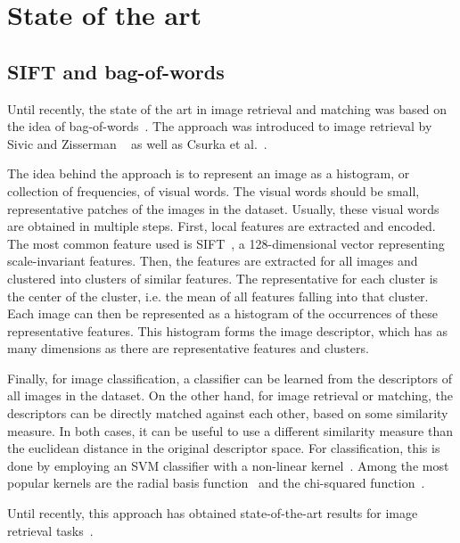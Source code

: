 
\chapter{State of the art}
\section{SIFT and bag-of-words}\label{sec:sift}
Until recently, the state of the art in image retrieval and matching
was based on the idea of
bag-of-words~\cite{philbin_object_2007,mikulik_learning_2013}.
The approach was introduced to image retrieval by Sivic and Zisserman
~\cite{sivic_video_2003} as well as Csurka et al.~\cite{csurka_visual_2004}.

The idea behind the approach is to represent an image as a histogram,
or collection of frequencies, of visual words. The visual words should
be small, representative patches of the images in the dataset.
Usually, these visual words are obtained in multiple steps. First,
local features are extracted and encoded. The most common feature used
is SIFT~\cite{lowe_distinctive_2004}, a 128-dimensional vector representing
scale-invariant features. Then, the features are extracted for all
images and clustered into clusters of similar features.
The representative for each cluster is the center of the cluster,
i.e. the mean of all features falling into that cluster.
Each image can then be represented as a histogram of the occurrences
of these representative features.
This histogram forms the image descriptor, which has as many dimensions
as there are representative features and clusters.

Finally, for image classification, a classifier can be learned from the
descriptors of all images in the dataset. On the other hand, for image
retrieval or matching, the descriptors can be directly matched against
each other, based on some similarity measure.
In both cases, it can be useful to use a different similarity measure
than the euclidean distance in the original descriptor space.
For classification, this is done by employing an SVM classifier with a
non-linear kernel~\cite{shawe-taylor_kernel_2004}.
Among the most popular kernels are the
radial basis function~\cite{scholkopf_comparing_1997}
and the chi-squared function~\cite{vedaldi_efficient_2012}.

Until recently, this approach has obtained state-of-the-art results for
image retrieval tasks~\cite{mikulik_learning_2013}.

